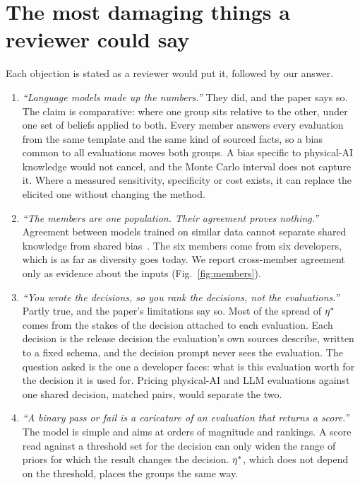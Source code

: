 \documentclass{article}
\begin{document}
\FloatBarrier
\section{The most damaging things a reviewer could say}
\label{sec:reviewer}

Each objection is stated as a reviewer would put it, followed by our answer.

\begin{enumerate}
\item \emph{``Language models made up the numbers.''} They did, and the paper says so. The claim is comparative: where one group sits relative to the other, under one set of beliefs applied to both. Every member answers every evaluation from the same template and the same kind of sourced facts, so a bias common to all evaluations moves both groups. A bias specific to physical-AI knowledge would not cancel, and the Monte Carlo interval does not capture it. Where a measured sensitivity, specificity or cost exists, it can replace the elicited one without changing the method.
\item \emph{``The members are one population. Their agreement proves nothing.''} Agreement between models trained on similar data cannot separate shared knowledge from shared bias~\citep{kim2025correlated}. The six members come from six developers, which is as far as diversity goes today. We report cross-member agreement only as evidence about the inputs (Fig.~\ref{fig:members}).
\item \emph{``You wrote the decisions, so you rank the decisions, not the evaluations.''} Partly true, and the paper's limitations say so. Most of the spread of $\eta^{*}$ comes from the stakes of the decision attached to each evaluation. Each decision is the release decision the evaluation's own sources describe, written to a fixed schema, and the decision prompt never sees the evaluation. The question asked is the one a developer faces: what is this evaluation worth for the decision it is used for. Pricing physical-AI and LLM evaluations against one shared decision, matched pairs, would separate the two.
\item \emph{``A binary pass or fail is a caricature of an evaluation that returns a score.''} The model is simple and aims at orders of magnitude and rankings. A score read against a threshold set for the decision can only widen the range of priors for which the result changes the decision. $\eta^{*}$, which does not depend on the threshold, places the groups the same way. %

\end{enumerate}
\end{document}
